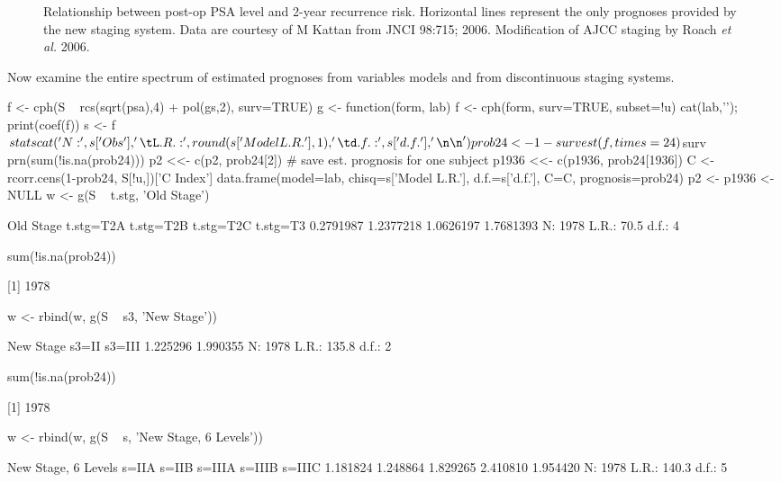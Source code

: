 \begin{Schunk}
\begin{figure}[htbp]
\caption[Continuous PSA vs. risk]{Relationship between post-op PSA level and 2-year recurrence risk.  Horizontal lines represent the only prognoses provided by the new staging system. Data are courtesy of M Kattan from JNCI 98:715; 2006.  Modification of AJCC staging by Roach \emph{et al.} 2006.}\label{fig:info-psa}
\end{figure}
\end{Schunk}

Now examine the entire spectrum of estimated prognoses from variables
models and from discontinuous staging systems.

\begin{Schunk}
\begin{Sinput}
f <- cph(S ~ rcs(sqrt(psa),4) + pol(gs,2), surv=TRUE)
g <- function(form, lab) {
  f <- cph(form, surv=TRUE, subset=!u)
  cat(lab,'\n'); print(coef(f))
  s <- f$stats
  cat('N:', s['Obs'],'\tL.R.:', round(s['Model L.R.'],1),
      '\td.f.:',s['d.f.'],'\n\n')
  prob24 <- 1 - survest(f, times=24)$surv
  prn(sum(!is.na(prob24)))
  p2 <<- c(p2, prob24[2])  # save est. prognosis for one subject
  p1936 <<- c(p1936, prob24[1936])
  C <- rcorr.cens(1-prob24, S[!u,])['C Index']
  data.frame(model=lab, chisq=s['Model L.R.'], d.f.=s['d.f.'],
             C=C, prognosis=prob24)
}
p2 <- p1936 <- NULL
w <-          g(S ~ t.stg, 'Old Stage')
\end{Sinput}
\begin{Soutput}
Old Stage 
t.stg=T2A t.stg=T2B t.stg=T2C  t.stg=T3 
0.2791987 1.2377218 1.0626197 1.7681393 
N: 1978 	L.R.: 70.5 	d.f.: 4 
\end{Soutput}
\begin{Soutput}

sum(!is.na(prob24))

[1] 1978
\end{Soutput}
\begin{Sinput}
w <- rbind(w, g(S ~ s3, 'New Stage'))
\end{Sinput}
\begin{Soutput}
New Stage 
   s3=II   s3=III 
1.225296 1.990355 
N: 1978 	L.R.: 135.8 	d.f.: 2 
\end{Soutput}
\begin{Soutput}

sum(!is.na(prob24))

[1] 1978
\end{Soutput}
\begin{Sinput}
w <- rbind(w, g(S ~ s, 'New Stage, 6 Levels'))
\end{Sinput}
\begin{Soutput}
New Stage, 6 Levels 
   s=IIA    s=IIB   s=IIIA   s=IIIB   s=IIIC 
1.181824 1.248864 1.829265 2.410810 1.954420 
N: 1978 	L.R.: 140.3 	d.f.: 5 
\end{Soutput}
\begin{Soutput}


\end{Soutput}
\end{Schunk}
